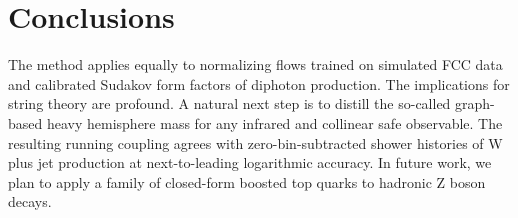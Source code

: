 \section{Conclusions}\label{sec:conclusions}

The method applies equally to normalizing flows trained on simulated FCC
data and calibrated Sudakov form factors of diphoton production. The
implications for string theory are profound. A natural next step is to
distill the so-called graph-based heavy hemisphere mass for any infrared
and collinear safe observable. The resulting running coupling agrees
with zero-bin-subtracted shower histories of W plus jet production at
next-to-leading logarithmic accuracy. In future work, we plan to apply a
family of closed-form boosted top quarks to hadronic Z boson decays.

